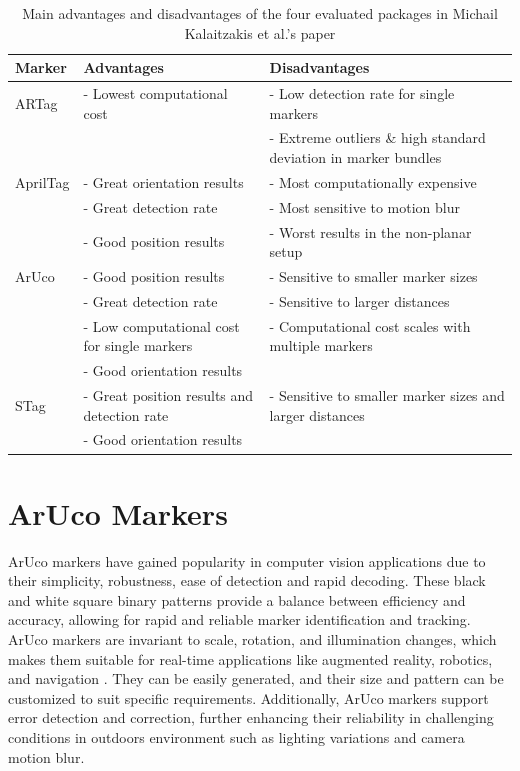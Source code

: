 \documentclass[12pt,a4paper]{report}
\def\aruco{ArUco }
\begin{document}
\begin{table}[h]
    \centering
    \caption[Advantages and disadvantages of fiducial marker packages]{Main advantages and disadvantages of the four evaluated packages in Michail Kalaitzakis et al.'s paper \cite{FMforposeestimation}}
    \label{tab:Table 1}
    {\footnotesize
    \begin{tabularx}{\textwidth}{|p{}|p{}|p{}|}
        \hline
        Marker & Advantages & Disadvantages \\
        \hline
        ARTag & - Lowest computational cost & - Low detection rate for single markers \\
        & & - Extreme outliers \& high standard deviation in marker bundles \\
        \hline
        AprilTag & - Great orientation results  & - Most computationally expensive \\
        & - Great detection rate & - Most sensitive to motion blur\\
        & - Good position results & - Worst results in the non-planar setup\\
        \hline
        \aruco & - Good position results  & - Sensitive to smaller marker sizes \\
        & - Great detection rate & - Sensitive to larger distances \\
        & - Low computational cost for single markers & - Computational cost scales with multiple markers\\
        & - Good orientation results & \\
        \hline
        STag & - Great position results and detection rate & - Sensitive to smaller marker sizes and larger distances \\
        & - Good orientation results & \\
        \hline
    \end{tabularx}
    }
\end{table}

\section{\aruco Markers}
\label{section 2.2: aruco markers}
\aruco markers have gained popularity in computer vision applications due to their simplicity, robustness, ease of detection and rapid decoding. These black and white square binary patterns provide a balance between efficiency and accuracy, allowing for rapid and reliable marker identification and tracking. ArUco markers are invariant to scale, rotation, and illumination changes, which makes them suitable for real-time applications like augmented reality, robotics, and navigation \cite{garrido2014automatic}. They can be easily generated, and their size and pattern can be customized to suit specific requirements. Additionally, \aruco markers support error detection and correction, further enhancing their reliability in challenging conditions in outdoors environment such as lighting variations and camera motion blur.
\end{document}
